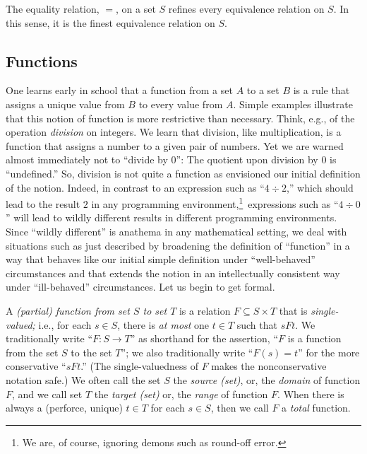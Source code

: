 \begin{theorem}
\label{thm:equality=finest-equiv}
The equality relation, $=$, on a set $S$ refines every equivalence
relation on $S$.  In this sense, it is the finest equivalence relation
on $S$.
\end{theorem}

\subsection{Functions}
\label{sec:function}

One learns early in school that a function from a set $A$ to a set $B$
is a rule that assigns a unique value from $B$ to every value from
$A$.  Simple examples illustrate that this notion of function is more
restrictive than necessary.  Think, e.g., of the operation {\em
  division} on integers.  We learn that division, like multiplication,
is a function that assigns a number to a given pair of numbers.  Yet
we are warned almost immediately not to ``divide by $0$'': The
quotient upon division by $0$ is ``undefined.''  So, division is not
quite a function as envisioned our initial definition of the notion.
Indeed, in contrast to an expression such as ``$4 \div 2$,'' which
should lead to the result $2$ in any programming
environment,\footnote{We are, of course, ignoring demons such as
  round-off error.}~expressions such as ``$4 \div 0$'' will lead to
wildly different results in different programming environments.  Since
``wildly different'' is anathema in any mathematical setting, we deal
with situations such as just described by broadening the definition of
``function'' in a way that behaves like our initial simple definition
under ``well-behaved'' circumstances and that extends the notion in an
intellectually consistent way under ``ill-behaved'' circumstances.
Let us begin to get formal.

A {\it (partial) function from set $S$ to set $T$} is a relation $F
\subseteq S \times T$ that is {\it single-valued;} i.e., for each $s
\in S$, there is {\em at most} one $t \in T$ such that $sFt$.  We
traditionally write ``$F: S \rightarrow T$'' as shorthand for the
assertion, ``$F$ is a function from the set $S$ to the set $T$''; we
also traditionally write ``$F(s) = t$'' for the more conservative
``$sFt$.''  (The single-valuedness of $F$ makes the nonconservative
notation safe.)  We often call the set $S$ the {\em source (set)},
or, the {\it domain}
%
of function $F$, and we call set $T$ the {\em target (set)}
or, the {\it range}
%
of function $F$.  When there is always a (perforce, unique) $t \in T$
for each $s \in S$, then we call $F$ a {\em total} function.


